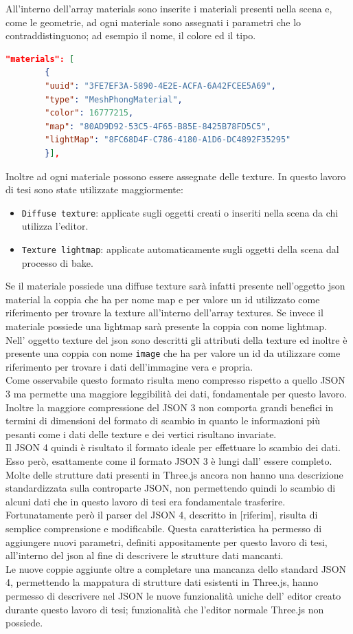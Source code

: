 All’interno dell’array materials sono inserite i materiali presenti nella scena e, come le geometrie, ad ogni materiale sono assegnati i parametri che lo contraddistinguono; ad esempio il nome, il colore ed il tipo.
\begin{lstlisting}[language=json]
"materials": [
        {
        "uuid": "3FE7EF3A-5890-4E2E-ACFA-6A42FCEE5A69",
        "type": "MeshPhongMaterial",
        "color": 16777215,
        "map": "80AD9D92-53C5-4F65-B85E-8425B78FD5C5",
        "lightMap": "8FC68D4F-C786-4180-A1D6-DC4892F35295"
        }],
\end{lstlisting}
Inoltre ad ogni materiale possono essere assegnate delle texture. In questo lavoro di tesi sono state utilizzate maggiormente:
\begin{itemize}
\item \texttt{Diffuse texture}: applicate sugli oggetti creati o inseriti nella scena da chi utilizza l’editor.
\item \texttt{Texture lightmap}: applicate automaticamente sugli oggetti della scena dal processo di bake.
\end{itemize}
Se il materiale possiede una diffuse texture sarà infatti presente nell’oggetto json material la coppia che ha per nome map e per valore un id utilizzato come riferimento per trovare la texture all’interno dell’array textures. 
Se invece il materiale possiede una lightmap sarà presente la coppia con nome lightmap.
\\
Nell’ oggetto texture del json sono descritti gli attributi della texture ed inoltre è presente una coppia con nome \texttt{image} che ha per valore un id da utilizzare come riferimento per trovare i dati dell’immagine vera e propria.
\\
Come osservabile questo formato risulta meno compresso rispetto a quello JSON 3 ma permette una maggiore leggibilità dei dati, fondamentale per questo lavoro. 
\\
Inoltre la maggiore compressione del JSON 3 non comporta grandi benefici in termini di dimensioni del formato di scambio in quanto le informazioni più pesanti come i dati delle texture e dei vertici risultano invariate.
\\
Il JSON 4 quindi è risultato il formato ideale per effettuare lo scambio dei dati. Esso però, esattamente come il formato JSON 3 è lungi dall’ essere completo. 
Molte delle strutture dati presenti in Three.js ancora non hanno una descrizione standardizzata sulla controparte JSON, non permettendo quindi lo scambio di alcuni dati che in questo lavoro di tesi era fondamentale trasferire.
\\
Fortunatamente però il parser del JSON 4, descritto in [riferim], risulta di semplice comprensione e modificabile. Questa caratteristica ha permesso di aggiungere nuovi parametri, definiti appositamente per questo lavoro di tesi, all’interno del json al fine di descrivere le strutture dati mancanti.
\\
Le nuove coppie aggiunte oltre a completare una mancanza dello standard JSON 4, permettendo la mappatura di strutture dati esistenti in Three.js, hanno permesso di descrivere nel JSON le nuove funzionalità uniche dell’ editor creato durante questo lavoro di tesi; funzionalità che l’editor normale Three.js non possiede.


